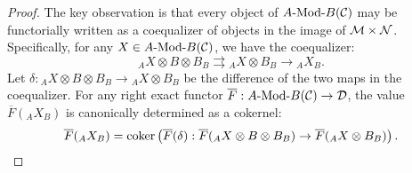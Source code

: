 \documentclass{amsart}
\begin{document}
\begin{proof}
The key observation is that every object of $\Mod{A}{B}(\cC)$ may be functorially written as a coequalizer of objects in the image of $\mathcal M \times \mathcal N$. Specifically, for any $X \in \Mod{A}{B}(\cC)$, we have the coequalizer:
\begin{equation*}
	{}_A X \otimes B \otimes B_B \rightrightarrows {}_A X \otimes B_B \to {}_A X_B.
\end{equation*}
Let %
$\delta: {}_A X \otimes B \otimes B_B \to {}_A X \otimes B_B$ 
be the difference of the two maps in the coequalizer. 
For any right exact functor $\overline{F}: \Mod{A}{B}(\cC) \to \cD$, the value $\overline{F}({}_A X_B)$ is canonically determined as a cokernel:
\begin{equation*}
	\overline{F}({}_A X_B) = \operatorname*{coker} \left( \overline{F}(\delta): \overline{F}( {}_A X \otimes B \otimes B_B) \to \overline{F}({}_A X \otimes B_B) \right).
\end{equation*} 
	

\end{proof}
\end{document}
